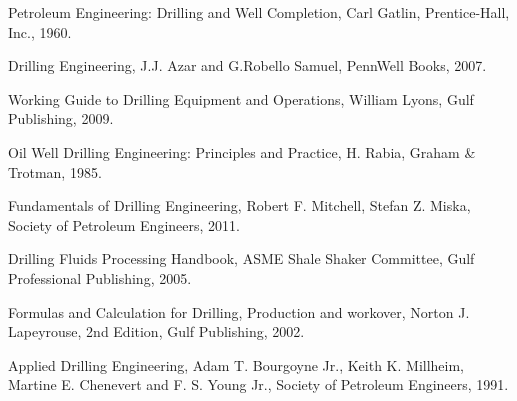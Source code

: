 \documentclass[11pt,a4paper]{report}
\begin{document}

\begin{thebibliography}{9}

Petroleum Engineering: Drilling and Well Completion, Carl Gatlin, Prentice-Hall, Inc.,
1960.
 
Drilling Engineering, J.J. Azar and G.Robello Samuel, PennWell Books, 2007.

 
Working Guide to Drilling Equipment and Operations, William Lyons, Gulf Publishing,
2009.

Oil Well Drilling Engineering: Principles and Practice, H. Rabia, Graham \& Trotman,
1985.

Fundamentals of Drilling Engineering, Robert F. Mitchell, Stefan Z. Miska, Society of
Petroleum Engineers, 2011.

Drilling Fluids Processing Handbook, ASME Shale Shaker Committee, Gulf
Professional Publishing, 2005.

Formulas and Calculation for Drilling, Production and workover, Norton J. Lapeyrouse,
2nd Edition, Gulf Publishing, 2002.

Applied Drilling Engineering, Adam T. Bourgoyne Jr., Keith K. Millheim, Martine E.
Chenevert and F. S. Young Jr., Society of Petroleum Engineers, 1991.


\end{thebibliography}
\end{document}

